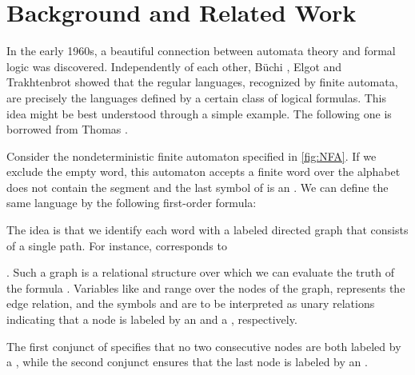 \documentclass[a4paper,11pt,twoside]{report} \pdfoutput=1
\begin{document}
\section{Background and Related Work}
In the early 1960s, a beautiful connection between automata theory and
formal logic was discovered. Independently of each other, Büchi
\cite{Buc60}, Elgot \cite{Elg61} and Trakhtenbrot \cite{Tra61} showed
that the regular languages, recognized by finite automata, are
precisely the languages defined by a certain class of logical
formulas. This idea might be best understood through a simple
example. The following one is borrowed from Thomas \cite{Tho91}.

\begin{example} \label{ex:NFA-MSO}
  Consider the nondeterministic finite automaton 
  specified in \cref{fig:NFA}. If we exclude the empty word, this
  automaton accepts a finite word  over the alphabet 
  \Iff  does not contain the segment  and the last symbol
  of  is an . We can define the same language by the following
  first-order formula:
  
  The idea is that we identify each word with a labeled directed graph
  that consists of a single path. For instance, 
  corresponds to  \!\!. Such a graph is
  a relational structure over which we can evaluate the truth of the
  formula . Variables like  and
   range over the nodes of the graph, 
  represents the edge relation, and the symbols  and
   are to be interpreted as unary relations
  indicating that a node is labeled by an  and a ,
  respectively.

  The first conjunct of  specifies that no two
  consecutive nodes are both labeled by a , while the second
  conjunct ensures that the last node is labeled by an .
\end{example}

\begin{SCfigure}[1.4][h!]
  \alignpic
     \caption{, a nondeterministic finite automaton whose
    language, when restricted to nonempty words, consists of all the
    finite words over the alphabet  that do not contain
    the segment  and that end with an .}
  \label{fig:NFA}
\end{SCfigure}
\end{document}
